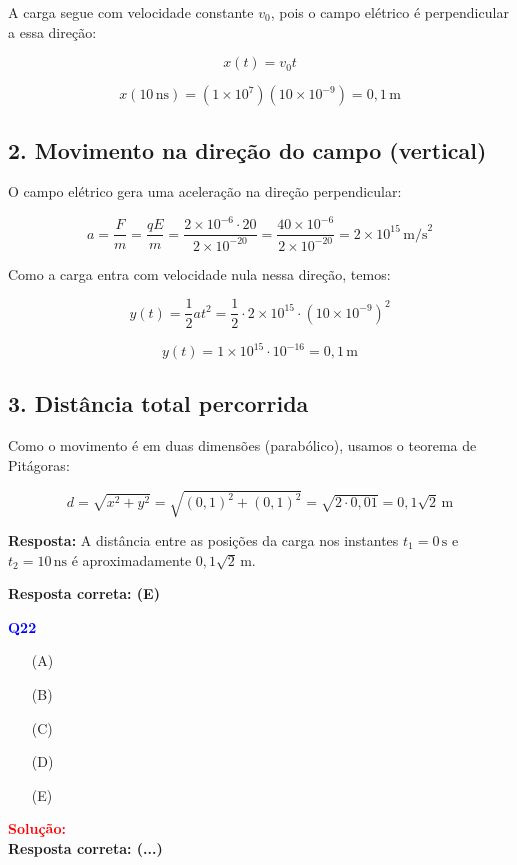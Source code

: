 \documentclass[a4paper,12pt]{article}
\begin{document}
\begin{flushleft}
A carga segue com velocidade constante \( v_0 \), pois o campo elétrico é perpendicular a essa direção:

\[
x(t) = v_0 t
\]

\[
x(10\, \text{ns}) = (1 \times 10^7)(10 \times 10^{-9}) = 0{,}1 \, \text{m}
\]

\subsection*{2. Movimento na direção do campo (vertical)}

O campo elétrico gera uma aceleração na direção perpendicular:

\[
a = \frac{F}{m} = \frac{qE}{m} = \frac{2 \times 10^{-6} \cdot 20}{2 \times 10^{-20}} = \frac{40 \times 10^{-6}}{2 \times 10^{-20}} = 2 \times 10^{15} \, \text{m/s}^2
\]

Como a carga entra com velocidade nula nessa direção, temos:

\[
y(t) = \frac{1}{2} a t^2 = \frac{1}{2} \cdot 2 \times 10^{15} \cdot (10 \times 10^{-9})^2
\]

\[
y(t) = 1 \times 10^{15} \cdot 10^{-16} = 0{,}1 \, \text{m}
\]

\subsection*{3. Distância total percorrida}

Como o movimento é em duas dimensões (parabólico), usamos o teorema de Pitágoras:

\[
d = \sqrt{x^2 + y^2} = \sqrt{(0{,}1)^2 + (0{,}1)^2} = \sqrt{2 \cdot 0{,}01} = 0{,}1\sqrt{2} \, \text{m}
\]

\textbf{Resposta:} A distância entre as posições da carga nos instantes \( t_1 = 0 \, \text{s} \) e \( t_2 = 10 \, \text{ns} \) 
é aproximadamente \( \boxed{ 0{,}1\sqrt{2} \, \text{m}} \).

\textbf{Resposta correta: \colorbox{green!50}{(E)}}

\end{flushleft}

\begin{flushleft}
\textbf{\textcolor{blue}{\Large Q22}}\\


\begin{itemize}
\item[(A)] 
\item[(B)]   
\item[(C)] 
\item[(D)] 
\item[(E)] 
\end{itemize}

\vspace{0.5cm}

\textcolor{red}{\textbf{Solução:}}\\

\textbf{Resposta correta: \colorbox{green!50}{(...)}}

\end{flushleft}
\end{document}
